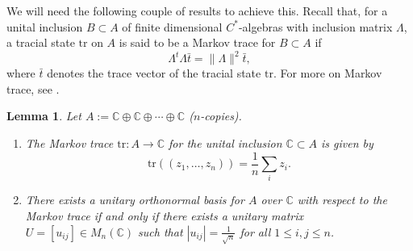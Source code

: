 \documentclass{amsart}
\newtheorem{lemma}[theorem]{Lemma}
\theoremstyle{definition}
\theoremstyle{theorem}
\newcommand{\rar}{\rightarrow}
\newcommand{\C}{\mathbb{C}}
\newcommand{\tr}{\mathrm{tr}}
\begin{document}
We will need the following couple of results to achieve this. Recall
that, for a unital inclusion $B \subset A$ of finite dimensional
$C^*$-algebras with inclusion matrix $\Lambda$, a tracial state $\tr$
on $A$ is said to be a Markov trace for $B \subset A$ if
\[
\Lambda^t \Lambda  \bar{t} = \|\Lambda\|^2 \bar{t},
\]
where $\bar{t}$ denotes the trace vector of the tracial state
$\tr$. For more on Markov trace, see \cite{GHJ,JS}.\color{black}
\begin{lemma}\label{markov-u-onb}
Let $A:=\C \oplus \C \oplus
\cdots \oplus \C$ ($n$-copies).\begin{enumerate}
  \item
    The Markov trace  $\tr : A \rar \C$ for the unital inclusion $\C \subset A$ is given by
    \[
    \tr((z_1, \ldots, z_n)) = \frac{1}{n} \sum_i
    z_i.
    \]
\item  There exists a unitary orthonormal basis for $A$ over $\C$ with respect to the Markov trace
if and only if  there exists a unitary matrix $U=[u_{ij}]\in M_n(\C)$ such that $
|u_{ij}| = \frac{1}{\sqrt{n}}$ for all $1 \leq i, j \leq n$.
\end{enumerate}
\end{lemma}
\end{document}
